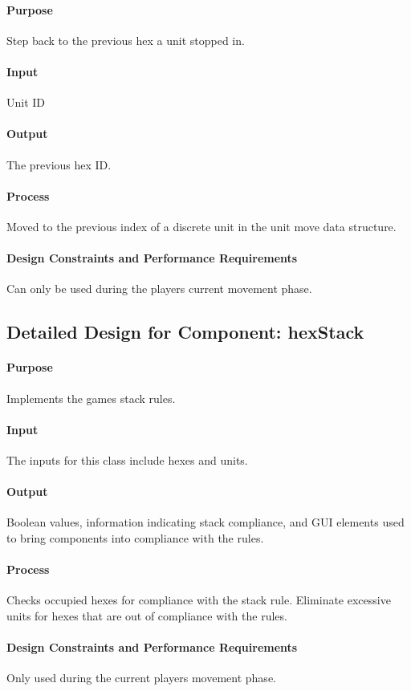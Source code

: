 \documentclass[12pt,a4paper,titlepage]{article}
\begin{document}
\paragraph{Purpose} Step back to the previous hex a unit stopped in.
\paragraph{Input} Unit ID
\paragraph{Output} The previous hex ID.
\paragraph{Process} Moved to the previous index of a discrete unit in the unit move data structure. 
\paragraph{Design Constraints and Performance Requirements} Can only be used during the players current movement phase.

\subsection{Detailed Design for Component: hexStack}
\paragraph{Purpose} Implements the games stack rules.
\paragraph{Input} The inputs for this class include hexes and units.
\paragraph{Output} Boolean values, information indicating stack compliance, and GUI elements used to bring components into compliance with the rules.
\paragraph{Process} Checks occupied hexes for compliance with the stack rule. Eliminate excessive units for hexes that are out of compliance with the rules.
\paragraph{Design Constraints and Performance Requirements} Only used during the current players movement phase. 
\end{document}
